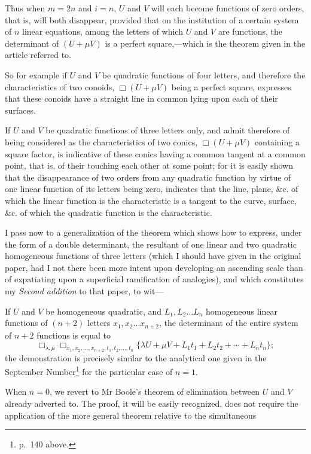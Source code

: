 \documentclass[11pt]{article}
\begin{document}
{{Thus when $m=2n$ and $i=n$, $U$ and $V$ will each become functions of zero orders, that is, will both disappear, provided that on the institution of a certain system of $n$ linear equations, among the letters of which $U$ and $V$ are functions, the determinant of $(U+\mu V)$ is a perfect square,---which is the theorem given in the article referred to.

So for example if $U$ and $V$ be quadratic functions of four letters, and therefore the characteristics of two conoids, $\Box(U+\mu V)$ being a perfect square, expresses that these conoids have a straight line in common lying upon each of their surfaces.

If $U$ and $V$ be quadratic functions of three letters only, and admit therefore of being considered as the characteristics of two conics, $\Box(U+\mu V)$ containing a square factor, is indicative of these conics having a common tangent at a common point, that is, of their touching each other at some point; for it is easily shown that the disappearance of two orders from any quadratic function by virtue of one linear function of its letters being zero, indicates that the line, plane, \&c. of which the linear function is the characteristic is a tangent to the curve, surface, \&c. of which the quadratic function is the characteristic.

I pass now to a generalization of the theorem which shows how to express, under the form of a double determinant, the resultant of one linear and two quadratic homogeneous functions of three letters (which I should have given in the original paper, had I not there been more intent upon developing an ascending scale than of expatiating upon a superficial ramification of analogies), and which constitutes my \emph{Second addition} to that paper, to wit---

If $U$ and $V$ be homogeneous quadratic, and $L_1,L_2\ldots L_n$ homogeneous linear functions of $(n+2)$ letters $x_1,x_2\ldots x_{n+2}$, the determinant of the entire system of $n+2$ functions is equal to
\[
\Box_{\lambda,\mu}\Box_{x_1,x_2,\ldots,x_{n+2},t_1,t_2,\ldots,t_n}
\{\lambda U+\mu V+L_1t_1+L_2t_2+\cdots+L_nt_n\};
\]
the demonstration is precisely similar to the analytical one given in the September Number\footnote{p.~140 above.} for the particular case of $n=1$.

When $n=0$, we revert to Mr Boole's theorem of elimination between $U$ and $V$ already adverted to. The proof, it will be easily recognized, does not require the application of the more general theorem relative to the simultaneous

}}
\end{document}
